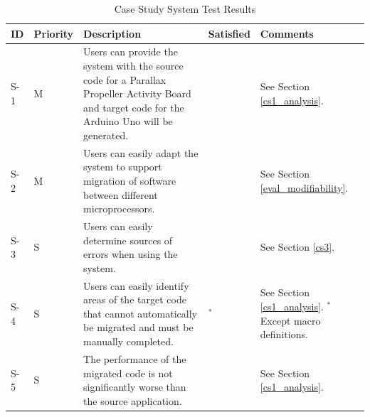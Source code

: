 \documentclass{UoYCSproject}
\newcommand{\ra}[1]{\renewcommand{\arraystretch}{#1}}
\newcommand{\xmark}{\ding{55}}%
\renewcommand{\checkmark}{\ding{51}}
\begin{document}
\begin{landscape}
\begin{table}[h!]\centering
\ra{1.3}
  \begin{tabular}{@{}p{}p{}p{}p{}p{}@{}} \toprule 
  \textbf{ID} & \textbf{Priority} & \textbf{Description} & \textbf{Satisfied} & \textbf{Comments} \\
  \midrule
  S-1 & M & Users can provide the system with the source code for a Parallax Propeller Activity Board and target code for the Arduino Uno will be generated. & \checkmark & See Section \ref{cs1_analysis}. \\ 
  S-2 & M & Users can easily adapt the system to support migration of software between different microprocessors. & \checkmark & See Section \ref{eval_modifiability}. \\
  S-3 & S & Users can easily determine sources of errors when using the system. & \xmark & See Section \ref{cs3}. \\
  S-4 & S & Users can easily identify areas of the target code that cannot automatically be migrated and must be manually completed. & \checkmark$^*$ & See Section \ref{cs1_analysis}. $^*$Except macro definitions. \\
  S-5 & S & The performance of the migrated code is not significantly worse than the source application. & \checkmark & See Section \ref{cs1_analysis}. \\
  \bottomrule
  \end{tabular}
\caption{Case Study System Test Results}
\label{table:case_study_sys_test_results}
\end{table}

\clearpage


\end{landscape}
\end{document}
